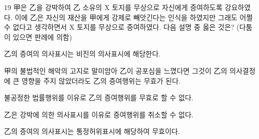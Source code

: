 \begin{question}{19}
甲은 乙을 강박하여 乙 소유의 X 토지를 무상으로 자신에게 증여하도록 강요하였다. 이에 乙은 자신의 재산을 甲에게 강제로 빼앗긴다는 인식을 하였지만 그래도 어쩔 수 없다고 생각하면서 X 토지를 무상으로 증여하였다. 다음 설명 중 옳은 것은? (다툼이 있으면 판례에 의함)
\begin{choices}
  \item 乙의 증여의 의사표시는 비진의 의사표시에 해당한다.
  \item 甲의 불법적인 해악의 고지로 말미암아 乙이 공포심을 느꼈다면 그것이 乙의 의사결정에 큰 영향을 주지 않았더라도 乙의 증여행위는 무효가 된다.
  \item 불공정한 법률행위를 이유로 乙의 증여행위를 무효로 할 수 없다.
  \item 乙은 강박에 의한 의사표시를 이유로 증여행위를 취소할 수 없다.
  \item 乙의 증여의 의사표시는 통정허위표시에 해당하여 무효이다.
\end{choices}
\end{question}
